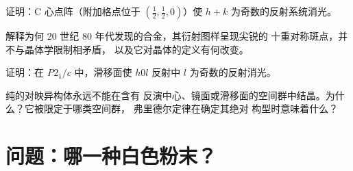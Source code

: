 \begin{exercise}[$\star\star$]\label{exo:b3:x-ray-diffraction:9}
证明：C 心点阵（附加格点位于 $(\frac12,\frac12,0)$）使
$h + k$ 为奇数的反射系统消光。
\end{exercise}

\begin{exercise}[$\star\star\star$]\label{exo:b3:x-ray-diffraction:10}
解释为何 20 世纪 80 年代发现的合金，其衍射图样呈现尖锐的
十重对称斑点，并不与晶体学限制相矛盾，
以及它对晶体的定义有何改变。
\end{exercise}

\begin{exercise}[$\star\star\star$]\label{exo:b3:x-ray-diffraction:11}
证明：在 \textit{P}$2_1/c$ 中，滑移面使 $h0l$ 反射中
$l$ 为奇数的反射消光。
\end{exercise}

\begin{exercise}[$\star\star\star$]\label{exo:b3:x-ray-diffraction:12}
纯的对映异构体永远不能在含有
反演中心、镜面或滑移面的空间群中结晶。为什么？它被限定于哪类空间群，
弗里德尔定律在确定其绝对
构型时意味着什么？
\end{exercise}

\clearpage
\enlargethispage{3\baselineskip}
\section{问题：哪一种白色粉末？}


